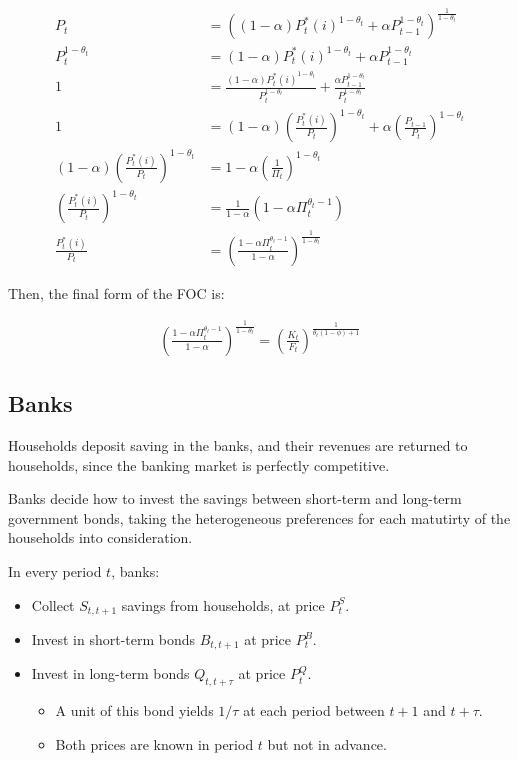 \documentclass[12pt]{article}
\begin{document}
\begin{align*}
    P_t &= \left((1-\alpha)P^*_t(i)^{1-\theta_t} + \alpha P_{t-1}^{1-\theta_t}\right)^\frac{1}{1-\theta_t}\\
    P_t^{1-\theta_t} &= (1-\alpha)P^*_t(i)^{1-\theta_t} + \alpha P_{t-1}^{1-\theta_t}\\
    1 &= \frac{(1-\alpha)P^*_t(i)^{1-\theta_t}}{P_t^{1-\theta_t}} + \frac{\alpha P_{t-1}^{1-\theta_t}}{P_t^{1-\theta_t}}\\
    1 &= (1-\alpha)\left(\frac{P^*_t(i)}{P_t}\right)^{1-\theta_t} + \alpha\left(\frac{P_{t-1}}{P_t}\right)^{1-\theta_t}\\
    (1-\alpha)\left(\frac{P^*_t(i)}{P_t}\right)^{1-\theta_t} &= 1 - \alpha\left(\frac{1}{\Pi_t}\right)^{1-\theta_t}\\
    \left(\frac{P^*_t(i)}{P_t}\right)^{1-\theta_t} &= \frac{1}{1-\alpha}\left(1 - \alpha\Pi_t^{\theta_t - 1}\right)\\
    \frac{P^*_t(i)}{P_t} &= \left(\frac{1 - \alpha\Pi_t^{\theta_t-1}}{1-\alpha}\right)^{\frac{1}{1-\theta_t}} \tag{F4}
\end{align*}

Then, the final form of the FOC is:

\begin{align*}
    \left(\frac{1 - \alpha\Pi_t^{\theta_t-1}}{1-\alpha}\right)^{\frac{1}{1-\theta_t}} = \left(\frac{K_t}{F_t}\right)^\frac{1}{\theta_t(1-\phi)+1} \tag{7}
\end{align*}



\subsection{Banks}

Households deposit saving in the banks, and their revenues are returned to households, since the banking market is perfectly competitive.

Banks decide how to invest the savings between short-term and long-term government bonds, taking the heterogeneous preferences for each matutirty of the households into consideration.

In every period $t$, banks:

\begin{itemize}
    \item Collect $S_{t,t+1}$ savings from households, at price $P^S_t$.
    \item Invest in short-term bonds $B_{t,t+1}$ at price $P^B_t$.
    \item Invest in long-term bonds $Q_{t,t+\tau}$ at price $P^Q_t$.
    \begin{itemize}
        \item A unit of this bond yields $1/\tau$ at each period between $t+1$ and $t+\tau$.
        \item Both prices are known in period $t$ but not in advance.
    \end{itemize}
\end{itemize}
\end{document}
